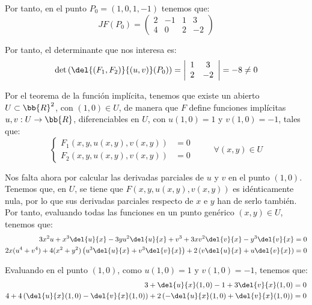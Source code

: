 \begin{ejercicio}
    Por tanto, en el punto $P_0=(1,0,1,-1)$ tenemos que:
    \begin{equation*}
        JF(P_0) = \left(
            \begin{array}{cccc}
                2 & -1 & 1 & 3 \\
                4 & 0 & 2 & -2
            \end{array}
        \right)
    \end{equation*}

    Por tanto, el determinante que nos interesa es:
    \begin{equation*}
        \det \left( \del{(F_1,F_2)}{(u,v)}(P_0) \right) =
        \left|
            \begin{array}{cc}
                1 & 3 \\
                2 & -2
            \end{array}
        \right| = -8 \neq 0
    \end{equation*}

    Por el teorema de la función implícita, tenemos que existe un abierto $U\subset \bb{R}^2$, con $(1,0)\in U$,
    de manera que $F$ define funciones implícitas $u,v:U\to \bb{R}$, diferenciables en $U$, con $u(1,0)=1$ y $v(1,0)=-1$,
    tales que:
    \begin{equation}
        \left\{
            \begin{array}{ll}
                F_1(x,y,u(x,y),v(x,y)) &= 0 \\
                F_2(x,y,u(x,y),v(x,y)) &= 0
            \end{array}
        \right. \hspace{1cm} \forall (x,y)\in U
    \end{equation}

    Nos falta ahora por calcular las derivadas parciales de $u$ y $v$ en el punto $(1,0)$.
    Tenemos que, en $U$, se tiene que $F(x,y,u(x,y),v(x,y))$ es idénticamente nula, por lo que sus derivadas parciales respecto de $x$ e $y$ han de serlo también.
    Por tanto, evaluando todas las funciones en un punto genérico $(x,y)\in U$, tenemos que:
    \begin{align*}
        3x^2u + x^3\del{u}{x} - 3yu^2\del{u}{x} + v^3 +3xv^2\del{v}{x} - y^3\del{v}{x} &= 0 \\
        2x(u^4+v^4) + 4(x^2+y^2)\left(u^3\del{u}{x} + v^3\del{v}{x}\right) + 2\left(v\del{u}{x} + u\del{v}{x}\right) &= 0
    \end{align*}

    Evaluando en el punto $(1,0)$, como $u(1,0)=1$ y $v(1,0)=-1$, tenemos que:
    \begin{align*}
        3 + \del{u}{x}(1,0) -1+ 3\del{v}{x}(1,0) &= 0 \\
        4 + 4\left(\del{u}{x}(1,0) - \del{v}{x}(1,0)\right) + 2\left(-\del{u}{x}(1,0)+\del{v}{x}(1,0)\right) &= 0
    \end{align*}


\end{ejercicio}
